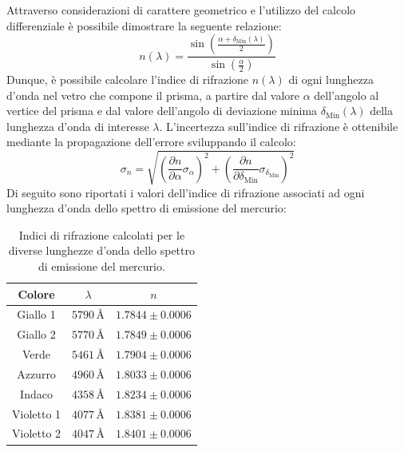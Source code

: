 \documentclass[a4paper,12pt]{article}
\begin{document}
Attraverso considerazioni di carattere geometrico e l’utilizzo del calcolo differenziale è possibile dimostrare la seguente relazione:
\[
n(\lambda) = \frac{\sin\left(\frac{\alpha + \delta_{\text{Min}}(\lambda)}{2}\right)}{\sin\left(\frac{\alpha}{2}\right)}
\]
Dunque, è possibile calcolare l’indice di rifrazione \( n(\lambda) \) di ogni lunghezza d’onda nel vetro che compone il prisma, a partire dal valore \( \alpha \) dell’angolo al vertice del prisma e dal valore dell’angolo di deviazione minima \( \delta_{\text{Min}}(\lambda) \) della lunghezza d’onda di interesse \( \lambda \).
L’incertezza sull’indice di rifrazione è ottenibile mediante la propagazione dell’errore sviluppando il calcolo:
\[
\sigma_n = \sqrt{\left( \frac{\partial n}{\partial \alpha} \sigma_\alpha \right)^2 + \left( \frac{\partial n}{\partial \delta_{\text{Min}}} \sigma_{\delta_{\text{Min}}} \right)^2 }
\]
Di seguito sono riportati i valori dell’indice di rifrazione associati ad ogni lunghezza d’onda dello spettro di emissione del mercurio:

\begin{table}[H]
\centering
\begin{tabular}{ccc}
\hline
\textbf{Colore} & \textbf{\( \lambda \)} & \textbf{\( n \)} \\ \hline
Giallo 1 & \( 5790 \, \text{\AA} \) & \( 1.7844 \pm 0.0006 \) \\ 
Giallo 2 & \( 5770 \, \text{\AA} \) & \( 1.7849 \pm 0.0006 \) \\
Verde & \( 5461 \, \text{\AA} \) & \( 1.7904 \pm 0.0006 \) \\ 
Azzurro  & \( 4960 \, \text{\AA} \) & \( 1.8033 \pm 0.0006 \) \\ 
Indaco & \( 4358 \, \text{\AA} \) & \( 1.8234 \pm 0.0006 \) \\ 
Violetto 1 & \( 4077 \, \text{\AA} \) & \( 1.8381 \pm 0.0006 \) \\ 
Violetto 2 & \( 4047 \, \text{\AA} \) & \( 1.8401 \pm 0.0006 \) \\ \hline
\end{tabular}
\caption{Indici di rifrazione calcolati per le diverse lunghezze d’onda dello spettro di emissione del mercurio.}
\label{tab:indici_rifrazione}
\end{table}
\end{document}
